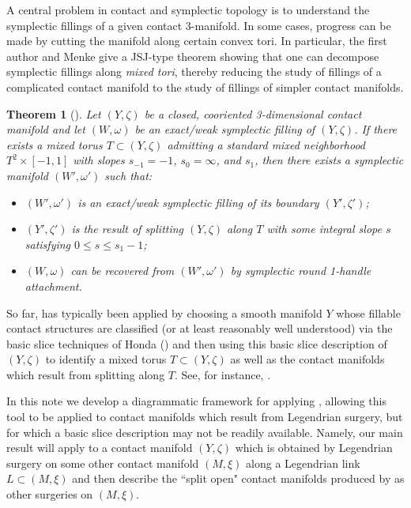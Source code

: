 \documentclass[11pt]{amsart}
\numberwithin{equation}{section}
\theoremstyle{plain}
\newtheorem{thm}[equation]{Theorem}%
\theoremstyle{definition}
\theoremstyle{remark}\newtheorem{rem}[equation]{Remark}%
\theoremstyle{remark}\newtheorem{obs}[equation]{Observation}%
\begin{document}
A central problem in contact and symplectic topology is to understand the 
symplectic fillings of a given contact $3$-manifold.  In some cases, progress can be made by cutting the manifold along certain convex tori.  In particular, the first author and Menke give a JSJ-type theorem showing that one can decompose symplectic fillings along \emph{mixed tori}, thereby reducing the study of fillings of a complicated contact manifold to the study of fillings of simpler contact manifolds.
\begin{thm}[{\cite[Theorem 1.1]{christian2018jsj}}]\label{thm:jsj}
Let $(Y,\zeta)$ be a closed, cooriented 3-dimensional contact manifold and let $(W,\omega)$ be an exact/weak symplectic filling of $(Y,\zeta)$.  If there exists a mixed torus $T\subset(Y,\zeta)$ admitting a standard mixed neighborhood $T^2\times[-1,1]$ with slopes $s_{-1}=-1$, $s_0=\infty$, and $s_1$, then there exists a symplectic manifold $(W',\omega')$ such that:
\begin{itemize}
    \item $(W',\omega')$ is an exact/weak symplectic filling of its boundary $(Y',\zeta')$;
    \item $(Y',\zeta')$ is the result of splitting $(Y,\zeta)$ along $T$ with some integral slope $s$ satisfying $0\leq s\leq s_1-1$;
    \item $(W,\omega)$ can be recovered from $(W',\omega')$ by symplectic round 1-handle attachment.
\end{itemize}
\end{thm}
So far,  has typically been applied by choosing a smooth manifold $Y$ whose fillable contact structures are classified (or at least reasonably well understood) via the basic slice techniques of Honda (\cite{honda2000classification,honda2000classification2}) and then using this basic slice description of $(Y,\zeta)$ to identify a mixed torus $T\subset(Y,\zeta)$ as well as the contact manifolds which result from splitting along $T$.  See, for instance, \cite{fossati2020topological,christian2021symplectic,etnyre2021symplectic,christian2023some,etnyre2024symplectic}.

In this note we develop a diagrammatic framework for applying , allowing this tool to be applied to contact manifolds which result from Legendrian surgery, but for which a basic slice description may not be readily available.  Namely, our main result will apply  to a contact manifold $(Y,\zeta)$ which is obtained by Legendrian surgery on some other contact manifold $(M,\xi)$ along a Legendrian link $L\subset (M,\xi)$ and then describe the ``split open" contact manifolds produced by  as other surgeries on $(M,\xi)$.
\end{document}

